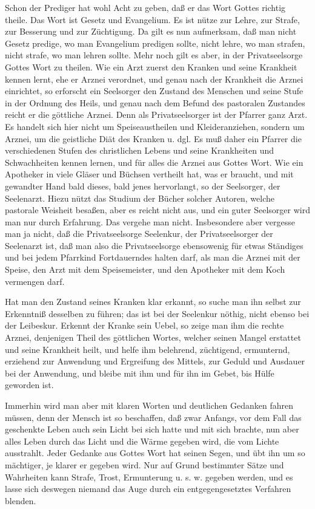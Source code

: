 Schon der Prediger hat wohl Acht zu geben, daß er das Wort Gottes richtig theile. Das Wort ist Gesetz und Evangelium. Es ist nütze zur Lehre, zur Strafe, zur Besserung und zur Züchtigung. Da gilt es nun aufmerksam, daß man nicht Gesetz predige, wo man Evangelium predigen sollte, nicht lehre, wo man strafen, nicht strafe, wo man lehren sollte. Mehr noch gilt es aber, in der Privatseelsorge Gottes Wort zu theilen. Wie ein Arzt zuerst den Kranken und seine Krankheit kennen lernt, ehe er Arznei verordnet, und genau nach der Krankheit die Arznei einrichtet, so erforscht ein Seelsorger den Zustand des Menschen und seine Stufe in der Ordnung des Heils, und genau nach dem Befund des pastoralen Zustandes reicht er die göttliche Arznei. Denn als Privatseelsorger ist der Pfarrer ganz Arzt. Es handelt sich hier nicht um Speiseaustheilen und Kleideranziehen, sondern um Arznei, um die geistliche Diät des Kranken u. dgl. Es muß daher ein Pfarrer die verschiedenen Stufen des christlichen Lebens und seine Krankheiten und Schwachheiten kennen lernen, und für alles die Arznei aus Gottes Wort. Wie ein Apotheker in viele Gläser und Büchsen vertheilt hat, was er braucht, und mit gewandter Hand bald dieses, bald jenes hervorlangt, so der Seelsorger, der Seelenarzt. Hiezu nützt das Studium der Bücher solcher Autoren, welche pastorale Weisheit besaßen, aber es reicht nicht aus, und ein guter Seelsorger wird man nur durch Erfahrung. Das vergehe
man nicht. Insbesondere aber vergesse man ja nicht, daß die Privatseelsorge Seelenkur, der Privatseelsorger der Seelenarzt ist, daß man also die Privatseelsorge ebensowenig für etwas Ständiges und bei jedem Pfarrkind Fortdauerndes halten darf, als man die Arznei mit der Speise, den Arzt mit dem Speisemeister, und den Apotheker mit dem Koch vermengen darf.

Hat man den Zustand seines Kranken klar erkannt, so suche man ihn selbst zur Erkenntniß desselben zu führen; das ist bei der Seelenkur nöthig, nicht ebenso bei der Leibeskur. Erkennt der Kranke sein Uebel, so zeige man ihm die rechte Arznei, denjenigen Theil des göttlichen Wortes, welcher seinen Mangel erstattet und seine Krankheit heilt, und helfe ihm belehrend, züchtigend, ermunternd, erziehend zur Anwendung und Ergreifung des Mittels, zur Geduld und Ausdauer bei der Anwendung, und bleibe mit ihm und für ihn im Gebet, bis Hülfe geworden ist.

Immerhin wird man aber mit klaren Worten und deutlichen Gedanken fahren müssen, denn der Mensch ist so beschaffen, daß zwar Anfangs, vor dem Fall das geschenkte Leben auch sein Licht bei sich hatte und mit sich brachte, nun aber alles Leben durch das Licht und die Wärme gegeben wird, die vom Lichte ausstrahlt. Jeder Gedanke aus Gottes Wort hat seinen Segen, und übt ihn um so mächtiger, je klarer er gegeben wird. Nur auf Grund bestimmter Sätze und Wahrheiten kann Strafe, Trost, Ermunterung u. s. w. gegeben werden, und es lasse sich deswegen niemand das Auge durch ein entgegengesetztes Verfahren blenden.

